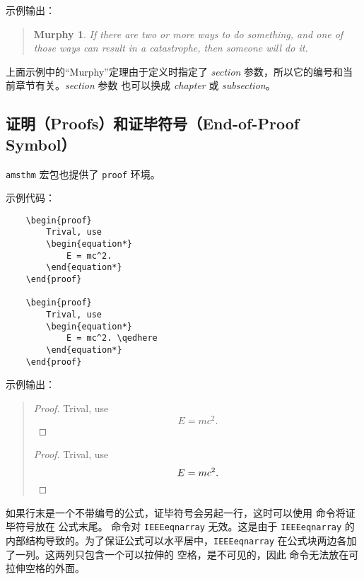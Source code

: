 \documentclass[UTF8]{ctexart}
\begin{document}
示例输出：
\begin{quote}
    \newtheorem{mur}{Murphy}[section]

    \begin{mur}
        If there are two or more ways to do something, and one of those ways can
        result in a catastrophe, then someone will do it.
    \end{mur}
\end{quote}

上面示例中的“Murphy”定理由于定义时指定了 \emph{section} 参数，所以它的编号和当前章节有关。\emph{section} 参数
也可以换成 \emph{chapter} 或 \emph{subsection}。

\subsection{证明（Proofs）和证毕符号（End-of-Proof Symbol）}
\texttt{amsthm} 宏包也提供了 \texttt{proof} 环境。

示例代码：
\begin{verbatim}
    \begin{proof}
        Trival, use
        \begin{equation*}
            E = mc^2.
        \end{equation*}
    \end{proof}

    \begin{proof}
        Trival, use
        \begin{equation*}
            E = mc^2. \qedhere
        \end{equation*}
    \end{proof}
\end{verbatim}

示例输出：
\begin{quote}
    \begin{proof}
        Trival, use
        \begin{equation*}
            E = mc^2.
        \end{equation*}
    \end{proof}

    \begin{proof}
        Trival, use
        \begin{equation*}
            E = mc^2. \qedhere
        \end{equation*}
    \end{proof}
\end{quote}

如果行末是一个不带编号的公式，证毕符号会另起一行，这时可以使用 \texttt{\qedhere} 命令将证毕符号放在
公式末尾。\texttt{\qedhere} 命令对 \texttt{IEEEeqnarray} 无效。这是由于 \texttt{IEEEeqnarray}
的内部结构导致的。为了保证公式可以水平居中，\texttt{IEEEeqnarray} 在公式块两边各加了一列。这两列只包含一个可以拉伸的
空格，是不可见的，因此 \texttt{\qedhere} 命令无法放在可拉伸空格的外面。
\end{document}

